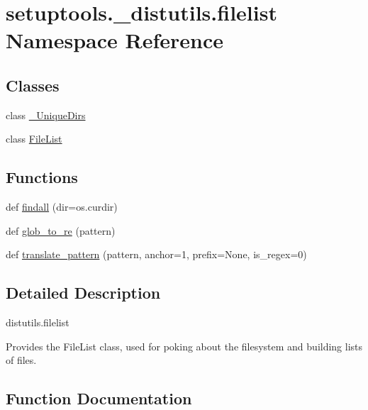 \hypertarget{namespacesetuptools_1_1__distutils_1_1filelist}{}\section{setuptools.\+\_\+distutils.\+filelist Namespace Reference}
\label{namespacesetuptools_1_1__distutils_1_1filelist}
\subsection*{Classes}
\begin{DoxyCompactItemize}
\item 
class \hyperlink{classsetuptools_1_1__distutils_1_1filelist_1_1__UniqueDirs}{\+\_\+\+Unique\+Dirs}
\item 
class \hyperlink{classsetuptools_1_1__distutils_1_1filelist_1_1FileList}{File\+List}
\end{DoxyCompactItemize}
\subsection*{Functions}
\begin{DoxyCompactItemize}
\item 
def \hyperlink{namespacesetuptools_1_1__distutils_1_1filelist_adb1e4f591180ae27773ce8d88a08f0b1}{findall} (dir=os.\+curdir)
\item 
def \hyperlink{namespacesetuptools_1_1__distutils_1_1filelist_ac6e5afc60b358dace671a325a9bcc2a6}{glob\+\_\+to\+\_\+re} (pattern)
\item 
def \hyperlink{namespacesetuptools_1_1__distutils_1_1filelist_abf11e021b1df18cc8d81a188f43ae2a2}{translate\+\_\+pattern} (pattern, anchor=1, prefix=None, is\+\_\+regex=0)
\end{DoxyCompactItemize}


\subsection{Detailed Description}
\begin{DoxyVerb}distutils.filelist

Provides the FileList class, used for poking about the filesystem
and building lists of files.
\end{DoxyVerb}
 

\subsection{Function Documentation}
\mbox{\label{namespacesetuptools_1_1__distutils_1_1filelist_adb1e4f591180ae27773ce8d88a08f0b1}} 

